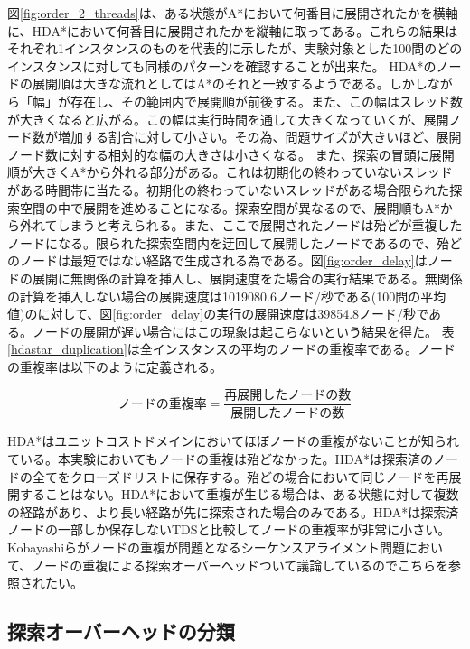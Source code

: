 \documentclass[uplatex]{jsarticle}
\begin{document}
図\ref{fig:order_2_threads}は、ある状態がA*において何番目に展開されたかを横軸に、HDA*において何番目に展開されたかを縦軸に取ってある。これらの結果はそれぞれ1インスタンスのものを代表的に示したが、実験対象とした100問のどのインスタンスに対しても同様のパターンを確認することが出来た。
HDA*のノードの展開順は大きな流れとしてはA*のそれと一致するようである。しかしながら「幅」が存在し、その範囲内で展開順が前後する。また、この幅はスレッド数が大きくなると広がる。この幅は実行時間を通して大きくなっていくが、展開ノード数が増加する割合に対して小さい。その為、問題サイズが大きいほど、展開ノード数に対する相対的な幅の大きさは小さくなる。
また、探索の冒頭に展開順が大きくA*から外れる部分がある。これは初期化の終わっていないスレッドがある時間帯に当たる。初期化の終わっていないスレッドがある場合限られた探索空間の中で展開を進めることになる。探索空間が異なるので、展開順もA*から外れてしまうと考えられる。また、ここで展開されたノードは殆どが重複したノードになる。限られた探索空間内を迂回して展開したノードであるので、殆どのノードは最短ではない経路で生成される為である。図\ref{fig:order_delay}はノードの展開に無関係の計算を挿入し、展開速度をた場合の実行結果である。無関係の計算を挿入しない場合の展開速度は1019080.6ノード/秒である(100問の平均値)のに対して、図\ref{fig:order_delay}の実行の展開速度は39854.8ノード/秒である。ノードの展開が遅い場合にはこの現象は起こらないという結果を得た。
表\ref{hdastar_duplication}は全インスタンスの平均のノードの重複率である。ノードの重複率は以下のように定義される。

\begin{equation}
	ノードの重複率 = \frac{再展開したノードの数}{展開したノードの数}
\end{equation}
\newline

HDA*はユニットコストドメインにおいてほぼノードの重複がないことが知られている\cite{Kishimoto2013}。本実験においてもノードの重複は殆どなかった。HDA*は探索済のノードの全てをクローズドリストに保存する。殆どの場合において同じノードを再展開することはない。HDA*において重複が生じる場合は、ある状態に対して複数の経路があり、より長い経路が先に探索された場合のみである。HDA*は探索済ノードの一部しか保存しないTDSと比較してノードの重複率が非常に小さい\cite{romein1999transposition}。Kobayashiらがノードの重複が問題となるシーケンスアライメント問題において、ノードの重複による探索オーバーヘッドついて議論しているのでこちらを参照されたい\cite{kobayashi2011evaluations}。


\subsection{探索オーバーヘッドの分類}
\end{document}
